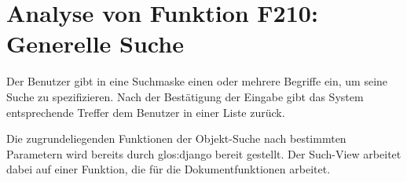 \section{Analyse von Funktion F210: Generelle Suche}
Der Benutzer gibt in eine Suchmaske einen oder mehrere Begriffe ein, um seine
Suche zu spezifizieren. Nach der Bestätigung der Eingabe gibt das System
entsprechende Treffer dem Benutzer in einer Liste zurück.


Die zugrundeliegenden Funktionen der Objekt-Suche nach bestimmten Parametern
wird bereits durch \gls{glos:django} bereit gestellt. Der Such-View arbeitet dabei auf
einer Funktion, die für die Dokumentfunktionen arbeitet.
